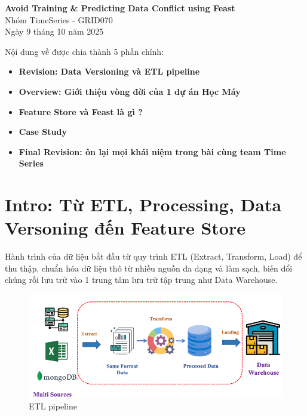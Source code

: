 \documentclass[11pt]{article}
\renewcommand{\maketitle}{
    \begin{center}
        \fontsize{18}{20}\selectfont\textbf{Avoid Training \& Predicting Data Conflict using Feast}\\[1em]
        \fontsize{14}{16}\selectfont Nhóm TimeSeries - GRID070\\[0.5em]
        \fontsize{14}{16}\selectfont Ngày 9 tháng 10 năm 2025
    \end{center}
    \vspace{1.5em}
}
\begin{document}
\maketitle

\begin{summarybox}
Nội dung về được chia thành 5 phần chính:
    \begin{itemize}
	\item \textbf{Revision: Data Versioning và ETL pipeline}
	\item \textbf{Overview: Giới thiệu vòng đời của 1 dự án Học Máy}
	\item \textbf{Feature Store và Feast là gì ?}
	\item \textbf{Case Study}
	\item \textbf{Final Revision: ôn lại mọi khái niệm trong bài cùng team Time Series}
    \end{itemize}
\end{summarybox}

\section{Intro: Từ ETL, Processing, Data Versoning đến Feature Store}

Hành trình của dữ liệu bắt đầu từ quy trình ETL (Extract, Transform, Load) để thu thập, chuẩn hóa dữ liệu thô từ nhiều nguồn đa dạng và làm sạch, biến đổi chúng rồi lưu trữ vào 1 trung tâm lưu trữ tập trung như Data Warehouse. \\
\begin{figure}[H]
    \centering
    \includegraphics[width=0.8\linewidth]{images/etl.png}
    \caption{ETL pipeline} 
\end{figure}
\end{document}
